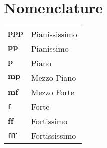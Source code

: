 \section*{Nomenclature}

\begin{longtable}{@{}l p{0.7\linewidth}@{}}

$\boldsymbol{ppp}$ & Pianississimo \\
$\boldsymbol{pp}$ & Pianissimo \\
$\boldsymbol{p}$ & Piano \\
$\boldsymbol{mp}$ & Mezzo Piano \\
$\boldsymbol{mf}$ & Mezzo Forte \\
$\boldsymbol{f}$ & Forte \\
$\boldsymbol{ff}$ & Fortissimo \\
$\boldsymbol{fff}$ & Fortississimo \\

\end{longtable}
